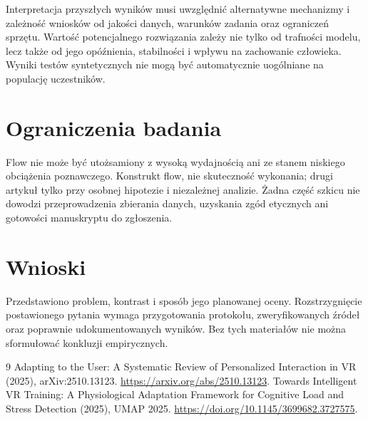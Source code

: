 \documentclass[11pt,a4paper]{article}
\begin{document}
Interpretacja przyszłych wyników musi uwzględnić alternatywne mechanizmy i zależność wniosków od jakości danych, warunków zadania oraz ograniczeń sprzętu. Wartość potencjalnego rozwiązania zależy nie tylko od trafności modelu, lecz także od jego opóźnienia, stabilności i wpływu na zachowanie człowieka. Wyniki testów syntetycznych nie mogą być automatycznie uogólniane na populację uczestników.

\section{Ograniczenia badania}

Flow nie może być utożsamiony z wysoką wydajnością ani ze stanem niskiego obciążenia poznawczego. Konstrukt flow, nie skuteczność wykonania; drugi artykuł tylko przy osobnej hipotezie i niezależnej analizie. Żadna część szkicu nie dowodzi przeprowadzenia zbierania danych, uzyskania zgód etycznych ani gotowości manuskryptu do zgłoszenia.

\section{Wnioski}

Przedstawiono problem, kontrast i sposób jego planowanej oceny. Rozstrzygnięcie postawionego pytania wymaga przygotowania protokołu, zweryfikowanych źródeł oraz poprawnie udokumentowanych wyników. Bez tych materiałów nie można sformułować konkluzji empirycznych.

\begin{thebibliography}{9}
 Adapting to the User: A Systematic Review of Personalized Interaction in VR (2025), arXiv:2510.13123. \url{https://arxiv.org/abs/2510.13123}.
 Towards Intelligent VR Training: A Physiological Adaptation Framework for Cognitive Load and Stress Detection (2025), UMAP 2025. \url{https://doi.org/10.1145/3699682.3727575}.
\end{thebibliography}
\end{document}
